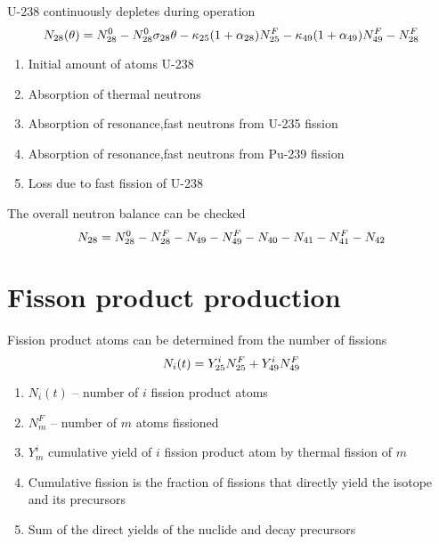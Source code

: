 \documentclass[aspectratio=1610,pdftex,dvipsnames,compress,xcolor={dvipsnames}]{beamer}
\begin{document}
\begin{frame}{U-238 continuously depletes during operation}
    \begin{equation}
        \Large
        N_{28}(\theta)=N_{28}^0-N_{28}^0\sigma_{28}\theta-\kappa_{25}(1 + \alpha_{28})N_{25}^F-\kappa_{49}(1 + \alpha_{49})N_{49}^F-N_{28}^F
    \end{equation}
    
    \vspace*{\fill}

    \begin{enumerate}[series=outerlist,topsep=0pt,itemsep=21pt,leftmargin=*,label=(\arabic*)]
        \item[]Initial amount of atoms U-238
        \item[]Absorption of thermal neutrons
        \item[]Absorption of resonance,fast neutrons from U-235 fission
        \item[]Absorption of resonance,fast neutrons from Pu-239 fission
        \item[]Loss due to fast fission of U-238
    \end{enumerate}
\end{frame}


\begin{frame}{The overall neutron balance can be checked}
    \begin{equation}
        \LARGE
        N_{28}=N_{28}^0-N_{28}^F-N_{49}-N_{49}^F-N_{40}-N_{41}-N_{41}^F-N_{42}
    \end{equation}
\end{frame}


\section{Fisson product production}


\addtocounter{framenumber}{-1} 
\begin{frame}{Fission product atoms can be determined from the number of fissions}
    \begin{equation}
        \LARGE
        N_i(t) = Y_{25}^iN_{25}^F + Y_{49}^iN_{49}^F
    \end{equation}
    
    \vspace*{\fill}

    \begin{enumerate}[series=outerlist,topsep=0pt,itemsep=21pt,leftmargin=*,label=(\arabic*)]
        \item[]$N_i(t)$ -- number of $i$ fission product atoms
        \item[]$N_m^F$ -- number of $m$ atoms fissioned
        \item[]$Y_m^i$ cumulative yield of $i$ fission product atom by thermal fission of $m$
        \item[]Cumulative fission is the fraction of fissions that directly yield the isotope and its precursors
        \item[]Sum of the direct yields of the nuclide and decay precursors
    \end{enumerate}
\end{frame}
\end{document}
